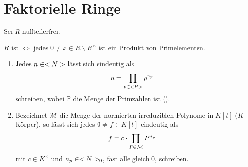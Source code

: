 \section{Faktorielle Ringe}

Sei $R$ nullteilerfrei.

\begin{definition}
	$R$ ist  $\iff$ jedes $0\neq x\in R\backslash R^\times$ ist ein Produkt von Primelementen.
\end{definition}

\begin{example}
	\begin{enumerate}
		\item Jedes $n\in\natur$ lässt sich eindeutig als
		\begin{align}
			n=\prod_{p\in\mathbb{P}} p^{n_p}\notag
		\end{align}
		schreiben, wobei $\mathbb{P}$ die Menge der Primzahlen ist ().
		\item Bezeichnet $\mathcal{M}$ die Menge der normierten irreduziblen Polynome in $K[t]$ ($K$ Körper), so lässt sich jedes $0\neq f\in K[t]$ eindeutig als
		\begin{align}
			f=c\cdot\prod_{P\in\mathcal{M}} P^{n_p}\notag
		\end{align}
		mit $c\in K^\times$ und $n_p\in\natur_0$, fast alle gleich 0, schreiben.
	\end{enumerate}
\end{example}